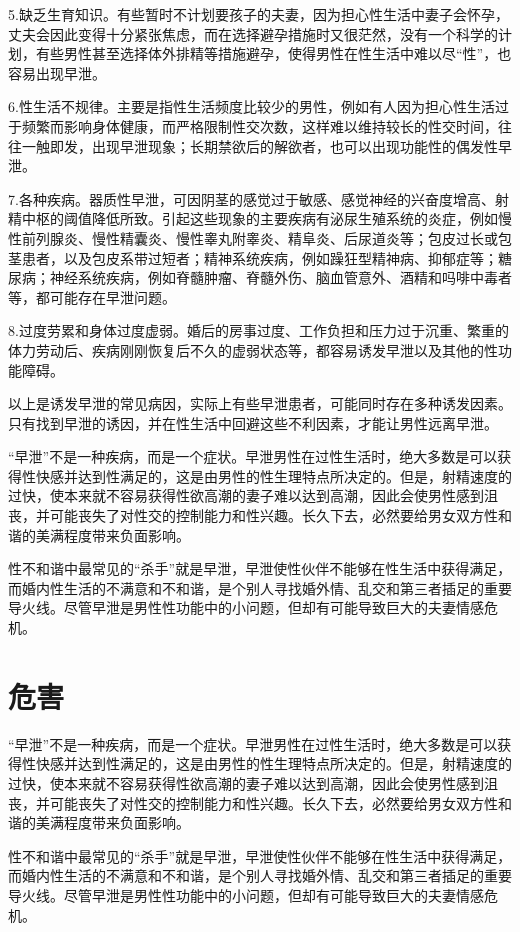 \documentclass[12pt,UTF8]{ctexbook}
\begin{document}
5.缺乏生育知识。有些暂时不计划要孩子的夫妻，因为担心性生活中妻子会怀孕，丈夫会因此变得十分紧张焦虑，而在选择避孕措施时又很茫然，没有一个科学的计划，有些男性甚至选择体外排精等措施避孕，使得男性在性生活中难以尽“性”，也容易出现早泄。

6.性生活不规律。主要是指性生活频度比较少的男性，例如有人因为担心性生活过于频繁而影响身体健康，而严格限制性交次数，这样难以维持较长的性交时间，往往一触即发，出现早泄现象；长期禁欲后的解欲者，也可以出现功能性的偶发性早泄。

7.各种疾病。器质性早泄，可因阴茎的感觉过于敏感、感觉神经的兴奋度增高、射精中枢的阈值降低所致。引起这些现象的主要疾病有泌尿生殖系统的炎症，例如慢性前列腺炎、慢性精囊炎、慢性睾丸附睾炎、精阜炎、后尿道炎等；包皮过长或包茎患者，以及包皮系带过短者；精神系统疾病，例如躁狂型精神病、抑郁症等；糖尿病；神经系统疾病，例如脊髓肿瘤、脊髓外伤、脑血管意外、酒精和吗啡中毒者等，都可能存在早泄问题。

8.过度劳累和身体过度虚弱。婚后的房事过度、工作负担和压力过于沉重、繁重的体力劳动后、疾病刚刚恢复后不久的虚弱状态等，都容易诱发早泄以及其他的性功能障碍。

以上是诱发早泄的常见病因，实际上有些早泄患者，可能同时存在多种诱发因素。只有找到早泄的诱因，并在性生活中回避这些不利因素，才能让男性远离早泄。

“早泄”不是一种疾病，而是一个症状。早泄男性在过性生活时，绝大多数是可以获得性快感并达到性满足的，这是由男性的性生理特点所决定的。但是，射精速度的过快，使本来就不容易获得性欲高潮的妻子难以达到高潮，因此会使男性感到沮丧，并可能丧失了对性交的控制能力和性兴趣。长久下去，必然要给男女双方性和谐的美满程度带来负面影响。

性不和谐中最常见的“杀手”就是早泄，早泄使性伙伴不能够在性生活中获得满足，而婚内性生活的不满意和不和谐，是个别人寻找婚外情、乱交和第三者插足的重要导火线。尽管早泄是男性性功能中的小问题，但却有可能导致巨大的夫妻情感危机。

\section{危害}

“早泄”不是一种疾病，而是一个症状。早泄男性在过性生活时，绝大多数是可以获得性快感并达到性满足的，这是由男性的性生理特点所决定的。但是，射精速度的过快，使本来就不容易获得性欲高潮的妻子难以达到高潮，因此会使男性感到沮丧，并可能丧失了对性交的控制能力和性兴趣。长久下去，必然要给男女双方性和谐的美满程度带来负面影响。

性不和谐中最常见的“杀手”就是早泄，早泄使性伙伴不能够在性生活中获得满足，而婚内性生活的不满意和不和谐，是个别人寻找婚外情、乱交和第三者插足的重要导火线。尽管早泄是男性性功能中的小问题，但却有可能导致巨大的夫妻情感危机。
\end{document}
